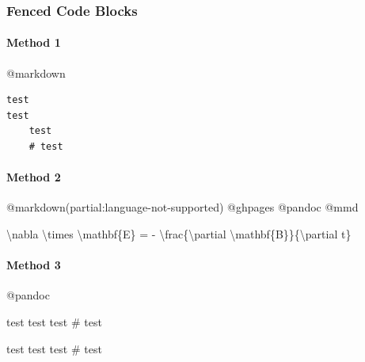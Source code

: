 \documentclass[]{article}
\newcommand{\VERB}{\Verb[commandchars=\\\{\}]}
\newenvironment{Shaded}{}{}
\newcommand{\BaseNTok}[1]{\textcolor[rgb]{0.25,0.63,0.44}{{#1}}}
\newcommand{\NormalTok}[1]{{#1}}
\providecommand{\tightlist}{%
  \setlength{\itemsep}{0pt}\setlength{\parskip}{0pt}}
\let\oldparagraph\paragraph
\renewcommand{\paragraph}[1]{\oldparagraph{#1}\mbox{}}
\begin{document}

\subsubsection{Fenced Code Blocks}\label{fenced-code-blocks}

\paragraph{Method 1}\label{method-1-1}

@markdown

\begin{verbatim}
test
test
    test
    # test
\end{verbatim}

\paragraph{Method 2}\label{method-2-1}

@markdown(partial:language-not-supported) @ghpages @pandoc @mmd

\begin{Shaded}
\begin{Highlighting}[]
\NormalTok{\textbackslash{}nabla \textbackslash{}times \textbackslash{}mathbf\{E\} = - \textbackslash{}frac\{\textbackslash{}partial \textbackslash{}mathbf\{B\}\}\{\textbackslash{}partial t\}}
\end{Highlighting}
\end{Shaded}

\paragraph{Method 3}\label{method-3}

@pandoc

\begin{Shaded}
\begin{Highlighting}[]
\NormalTok{test}
\NormalTok{test}
\BaseNTok{    test}
\BaseNTok{    # test}
\end{Highlighting}
\end{Shaded}

\hypertarget{mycode}{\label{mycode}}
\begin{Shaded}
\begin{Highlighting}[numbers=left,,firstnumber=100,]
\NormalTok{test}
\NormalTok{test}
\BaseNTok{    test}
\BaseNTok{    # test}
\end{Highlighting}
\end{Shaded}
\end{document}
